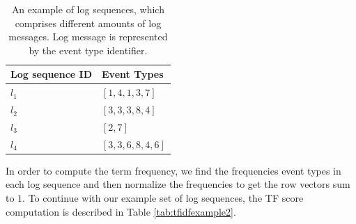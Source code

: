 \begin{table}
\centering
\begin{tabular}{@{}C{10cm}C{10cm}@{}}
\toprule
\textbf{Log sequence ID} & \textbf{Event Types} \\ \toprule
$l_1$                       & {$[1, 4, 1, 3, 7]$}               \\
$l_2$                         & {$[3, 3, 3, 8, 4]$}               \\
$l_3$                         & {$[2, 7]$}               \\
$l_4$                         & {$[3, 3, 6, 8, 4, 6]$}               \\ \bottomrule
\end{tabular}
\caption{An example of log sequences, which comprises different amounts of log messages. Log message is represented by the event type identifier.}\label{tab:tfidfexample1}
\end{table}

In order to compute the term frequency, we find the frequencies event types in each log sequence and then normalize the frequencies to get the row vectors sum to $1$. To continue with our example set of log sequences, the TF score computation is described in Table \ref{tab:tfidfexample2}.

